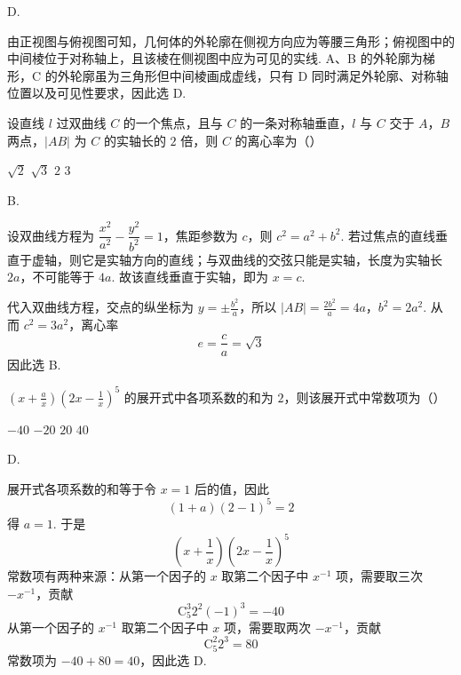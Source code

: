 \begin{answer}
D.
\end{answer}

\begin{solution}
由正视图与俯视图可知，几何体的外轮廓在侧视方向应为等腰三角形；俯视图中的中间棱位于对称轴上，且该棱在侧视图中应为可见的实线. A、B 的外轮廓为梯形，C 的外轮廓虽为三角形但中间棱画成虚线，只有 D 同时满足外轮廓、对称轴位置以及可见性要求，因此选 D.
\end{solution}

\begin{problem}
设直线 \(l\) 过双曲线 \(C\) 的一个焦点，且与 \(C\) 的一条对称轴垂直，\(l\) 与 \(C\) 交于 \(A\)，\(B\) 两点，\(|AB|\) 为 \(C\) 的实轴长的 \(2\) 倍，则 \(C\) 的离心率为（\quad）

\choices
    {\(\sqrt{2}\)}
    {\(\sqrt{3}\)}
    {\(2\)}
    {\(3\)}
\end{problem}

\begin{answer}
B.
\end{answer}

\begin{solution}
设双曲线方程为 \(\dfrac{x^{2}}{a^{2}}-\dfrac{y^{2}}{b^{2}}=1\)，焦距参数为 \(c\)，则 \(c^{2}=a^{2}+b^{2}\). 若过焦点的直线垂直于虚轴，则它是实轴方向的直线；与双曲线的交弦只能是实轴，长度为实轴长 \(2a\)，不可能等于 \(4a\). 故该直线垂直于实轴，即为 \(x=c\).

代入双曲线方程，交点的纵坐标为 \(y=\pm \frac{b^{2}}{a}\)，所以 \(|AB|=\frac{2b^{2}}{a}=4a\)，\(b^{2}=2a^{2}\).
从而 \(c^{2}=3a^{2}\)，离心率
\[
e=\frac ca=\sqrt3
\]
因此选 B.
\end{solution}

\begin{problem}
\(\left(x + \frac{a}{x}\right)\left(2x - \frac{1}{x}\right)^5\) 的展开式中各项系数的和为 \(2\)，则该展开式中常数项为（\quad）

\choices
    {\(-40\)}
    {\(-20\)}
    {\(20\)}
    {\(40\)}
\end{problem}

\begin{answer}
D.
\end{answer}

\begin{solution}
展开式各项系数的和等于令 \(x=1\) 后的值，因此
\[
(1+a)(2-1)^{5}=2
\]
得 \(a=1\). 于是
\[
\left(x+\frac1x\right)\left(2x-\frac1x\right)^{5}
\]
常数项有两种来源：从第一个因子的 \(x\) 取第二个因子中 \(x^{-1}\) 项，需要取三次 \(-x^{-1}\)，贡献
\[
\mathrm C_5^3 2^{2}(-1)^{3}=-40
\]
从第一个因子的 \(x^{-1}\) 取第二个因子中 \(x\) 项，需要取两次 \(-x^{-1}\)，贡献
\[
\mathrm C_5^2 2^{3}=80
\]
常数项为 \(-40+80=40\)，因此选 D.
\end{solution}

